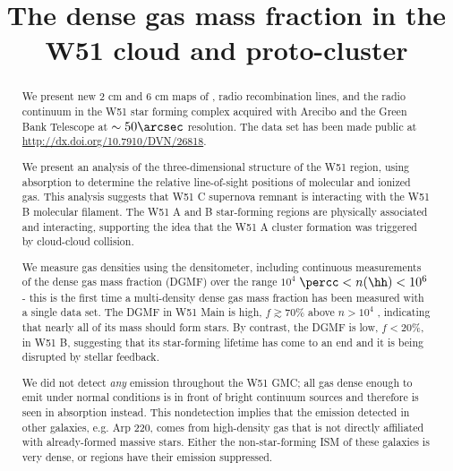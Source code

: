 

\title{The dense gas mass fraction in the W51 cloud and proto-cluster}




%

\begin{abstract}
We present new 2 cm and 6 cm maps of \formaldehyde, radio recombination lines,
and the radio continuum in the W51 star forming complex acquired with Arecibo
and the Green Bank Telescope at $\sim50\arcsec$ resolution.
The data set has been made public at \url{http://dx.doi.org/10.7910/DVN/26818}.

We present an analysis of the three-dimensional structure of the W51 region,
using \formaldehyde absorption to determine the relative line-of-sight
positions of molecular and ionized gas.  This analysis suggests that W51 C
supernova remnant is interacting with the W51 B molecular filament.  The W51 A
and B star-forming regions are physically associated and interacting,
supporting the idea that the W51 A cluster formation was triggered by
cloud-cloud collision.

We measure gas densities using the \formaldehyde densitometer,
including continuous measurements of the dense gas mass
fraction (DGMF) over the range $10^4$ $\percc< n(\hh) < 10^6$ \percc - this is
the first time a multi-density dense gas mass fraction has been measured with a
single data set.  The DGMF in W51 Main is high, $f\gtrsim70\%$ above $n>10^4$
\percc, indicating that
nearly all of its mass should form stars. By contrast, the DGMF is low,
$f<20\%$, in W51 B, suggesting that its star-forming lifetime has come to an
end and it is being disrupted by stellar feedback.

We did not detect \emph{any} \formaldehyde emission throughout the W51 GMC; all
gas dense enough to emit under normal conditions is in front of bright
continuum sources and therefore is seen in absorption instead.  This
nondetection implies that the \formaldehyde emission detected in other
galaxies, e.g. Arp 220, comes from high-density gas that is not directly
affiliated with already-formed massive stars.  Either the non-star-forming ISM
of these galaxies is very dense, or \hii regions have their emission suppressed.
\end{abstract}




